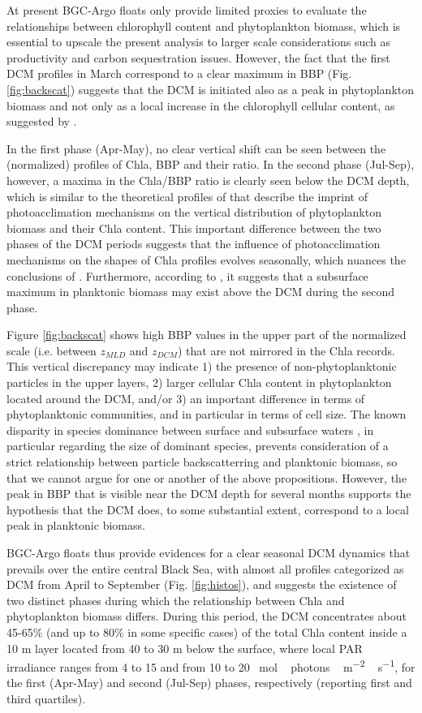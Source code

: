 \documentclass[journal abbreviation, manuscript]{copernicus}
\begin{document}
At present BGC-Argo floats only provide limited proxies to evaluate the relationships between chlorophyll content and phytoplankton biomass, which is essential to upscale the present analysis to larger scale considerations such as productivity and carbon sequestration issues.
However, the fact that the first DCM profiles in March correspond to a clear maximum in BBP (Fig. \ref{fig:backscat}) suggests that the DCM is initiated also as a peak in phytoplankton biomass and not only as a local increase in the chlorophyll cellular content, as suggested by \citet{Finenko2005}. 

In the first phase (Apr-May), no clear vertical shift can be seen between the (normalized) profiles of  Chla, BBP and their ratio. 
In the second phase (Jul-Sep), however, a maxima in the Chla/BBP ratio is clearly seen below the DCM depth, which is similar to the theoretical profiles of \citet{Fennel2003} that describe the imprint of photoacclimation mechanisms on the vertical distribution of phytoplankton biomass and their Chla content. 
This important difference between the two phases of the DCM periods suggests that the influence of photoacclimation mechanisms on the shapes of Chla profiles evolves seasonally, which nuances the conclusions of \cite{Finenko2005}.
Furthermore, according to \citet{Fennel2003}, it suggests that a subsurface maximum in planktonic biomass may exist above the DCM during the second phase. 

Figure \ref{fig:backscat} shows high BBP values in the upper part of the normalized scale (i.e. between $z_{MLD}$ and $z_{DCM}$) that are not mirrored in the Chla records.
This vertical discrepancy may indicate 1) the presence of non-phytoplanktonic particles in the upper layers, 2) larger cellular Chla content in phytoplankton located around the DCM, and/or 3) an important difference in terms of phytoplanktonic communities, and in particular in terms of cell size. 
The known disparity in species dominance between surface and subsurface waters \citep{Mikaelyan2020}, in particular regarding the size of dominant species, prevents consideration of a strict relationship between particle backscatterring and planktonic biomass, so that we cannot argue for one or another of the above propositions. 
However, the peak in BBP that is visible near the DCM depth for several months supports the hypothesis that the DCM does, to some substantial extent, correspond to a local peak in planktonic biomass.

BGC-Argo floats thus provide evidences for a clear seasonal DCM dynamics that prevails over the entire central Black Sea, with almost all profiles categorized as DCM from April to September (Fig. \ref{fig:histos}), and suggests the existence of two distinct phases during which the relationship between Chla and phytoplankton biomass differs.
During this period, the DCM concentrates about 45-65\% (and up to 80\% in some specific cases) of the total Chla content inside a 10 \unit{m} layer located from 40 to 30 \unit{m} below the surface, where local PAR irradiance ranges from 4 to 15 and from 10 to 20 \unit{\mu mol \, photons \,m^{-2}\,s^{-1}}, for the first (Apr-May) and second (Jul-Sep) phases, respectively (reporting first and third quartiles). 
\end{document}

